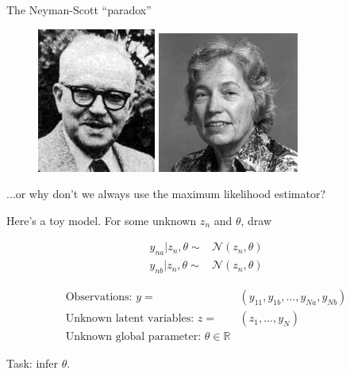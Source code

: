 

\begin{frame}{The Neyman-Scott ``paradox''}
\begin{figure}
    \centering
    \includegraphics[height=0.2\textwidth]{static_images/neyman.jpg}
    \includegraphics[height=0.2\textwidth]{static_images/ElizabethScott.jpg}
\end{figure}

...or why don't we always use the maximum likelihood estimator?

\hrulefill

Here's a toy model.  For some unknown $z_n$ and $\theta$, draw

\begin{align*}
    y_{na} | z_n, \theta \sim{}& \mathcal{N}(z_n, \theta)\\
    y_{nb} | z_n, \theta \sim{}& \mathcal{N}(z_n, \theta)
\end{align*}


\begin{align*}
    \textrm{Observations: }y ={}& (y_{11}, y_{1b}, \ldots, y_{Na}, y_{Nb})\\
    \textrm{Unknown latent variables: }z ={}& (z_1, \ldots, y_N)\\
    \textrm{Unknown global parameter: }\theta \in \mathbb{R}
\end{align*}

Task: infer $\theta$.

\end{frame}



